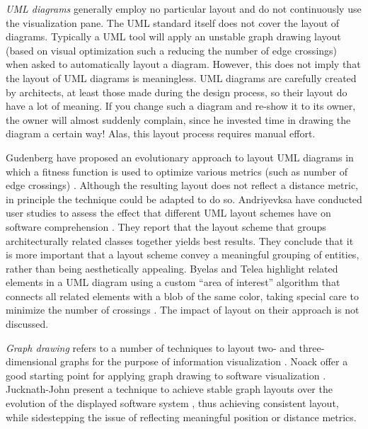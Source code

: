 \emph{UML diagrams} generally employ no particular layout and do not continuously use the visualization pane. The UML standard itself does not cover the layout of diagrams. Typically a UML tool will apply an unstable graph drawing layout (\eg based on visual optimization such a reducing the number of edge crossings) when asked to automatically layout a diagram. However, this does not imply that the layout of UML diagrams is meaningless. UML diagrams are carefully created by architects, at least those made during the design process, so their layout do have a lot of meaning. If you change such a diagram and re-show it to its owner, the owner will almost suddenly complain, since he invested time in drawing the diagram a certain way! Alas, this layout process requires manual effort.

Gudenberg \etal have proposed an evolutionary approach to layout UML diagrams in which a fitness function is used to optimize various metrics (such as number of edge crossings) \cite{Gude06a}. Although the resulting layout does not reflect a distance metric, in principle the technique could be adapted to do so. Andriyevksa \etal have conducted user studies to assess the effect that different UML layout schemes have on software comprehension \cite{Andr05a}.
They report that the layout scheme that groups architecturally related classes together yields best results. They conclude that it is more important that a layout scheme convey %
a meaningful grouping of entities, rather than being aesthetically appealing. Byelas and Telea highlight related elements in a UML
diagram using a custom ``area of interest'' algorithm that connects all related elements with a blob of the same color, taking special care to minimize the number of crossings \cite{Byel06a}.
The impact of layout on their approach is not discussed.

\emph{Graph drawing} refers to a number of techniques to layout two- and three-dimensional graphs for the purpose of information visualization \cite{Ware04a,Kauf01b}. Noack \etal offer a good starting point for applying graph drawing to software visualization \cite{Noac05a}. Jucknath-John \etal present a technique to achieve stable graph layouts over the evolution of the displayed software system \cite{Juck06a}, thus achieving consistent layout, while sidestepping the issue of reflecting meaningful position or distance metrics.

